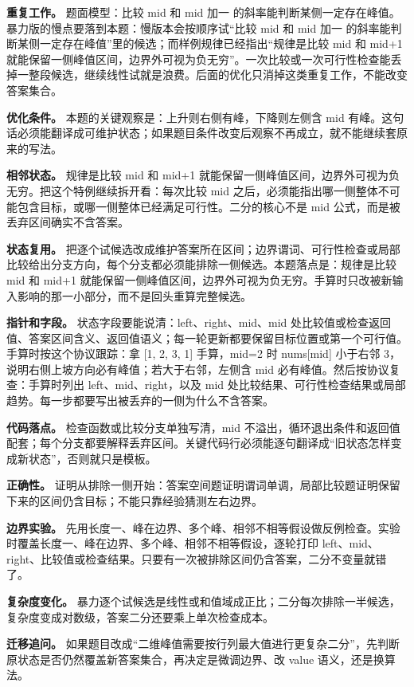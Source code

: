 \textbf{重复工作。} 题面模型：比较 mid 和 mid 加一 的斜率能判断某侧一定存在峰值。暴力版的慢点要落到本题：慢版本会按顺序试“比较 mid 和 mid 加一 的斜率能判断某侧一定存在峰值”里的候选；而样例规律已经指出“规律是比较 mid 和 mid+1 就能保留一侧峰值区间，边界外可视为负无穷”。一次比较或一次可行性检查能丢掉一整段候选，继续线性试就是浪费。后面的优化只消掉这类重复工作，不能改变答案集合。

\textbf{优化条件。} 本题的关键观察是：上升则右侧有峰，下降则左侧含 mid 有峰。这句话必须能翻译成可维护状态；如果题目条件改变后观察不再成立，就不能继续套原来的写法。

\textbf{相邻状态。} 规律是比较 mid 和 mid+1 就能保留一侧峰值区间，边界外可视为负无穷。把这个特例继续拆开看：每次比较 mid 之后，必须能指出哪一侧整体不可能包含目标，或哪一侧整体已经满足可行性。二分的核心不是 mid 公式，而是被丢弃区间确实不含答案。

\textbf{状态复用。} 把逐个试候选改成维护答案所在区间；边界谓词、可行性检查或局部比较给出分支方向，每个分支都必须能排除一侧候选。本题落点是：规律是比较 mid 和 mid+1 就能保留一侧峰值区间，边界外可视为负无穷。手算时只改被新输入影响的那一小部分，而不是回头重算完整候选。

\textbf{指针和字段。} 状态字段要能说清：left、right、mid、mid 处比较值或检查返回值、答案区间含义、返回值语义；每一轮更新都要保留目标位置或第一个可行值。手算时按这个协议跟踪：拿 [1, 2, 3, 1] 手算，mid=2 时 nums[mid] 小于右邻 3，说明右侧上坡方向必有峰值；若大于右邻，左侧含 mid 必有峰值。然后按协议复查：手算时列出 left、mid、right，以及 mid 处比较结果、可行性检查结果或局部趋势。每一步都要写出被丢弃的一侧为什么不含答案。

\textbf{代码落点。} 检查函数或比较分支单独写清，mid 不溢出，循环退出条件和返回值配套；每个分支都要解释丢弃区间。关键代码行必须能逐句翻译成“旧状态怎样变成新状态”，否则就只是模板。

\textbf{正确性。} 证明从排除一侧开始：答案空间题证明谓词单调，局部比较题证明保留下来的区间仍含目标；不能只靠经验猜测左右边界。

\textbf{边界实验。} 先用长度一、峰在边界、多个峰、相邻不相等假设做反例检查。实验时覆盖长度一、峰在边界、多个峰、相邻不相等假设，逐轮打印 left、mid、right、比较值或检查结果。只要有一次被排除区间仍含答案，二分不变量就错了。

\textbf{复杂度变化。} 暴力逐个试候选是线性或和值域成正比；二分每次排除一半候选，复杂度变成对数级，答案二分还要乘上单次检查成本。

\textbf{迁移追问。} 如果题目改成“二维峰值需要按行列最大值进行更复杂二分”，先判断原状态是否仍然覆盖新答案集合，再决定是微调边界、改 value 语义，还是换算法。

